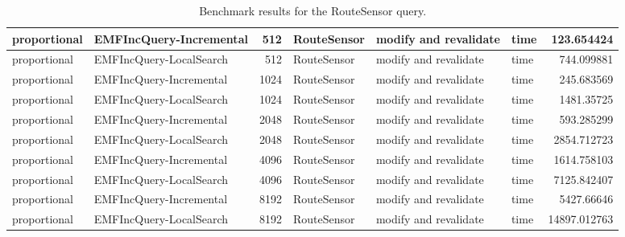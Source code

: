\begin{table}
\begin{tabular}{| l | l | r | l | l | l | r |}
proportional & EMFIncQuery-Incremental & 512 & RouteSensor & modify and revalidate & time & 123.654424\\\hline
proportional & EMFIncQuery-LocalSearch & 512 & RouteSensor & modify and revalidate & time & 744.099881\\\hline
proportional & EMFIncQuery-Incremental & 1024 & RouteSensor & modify and revalidate & time & 245.683569\\\hline
proportional & EMFIncQuery-LocalSearch & 1024 & RouteSensor & modify and revalidate & time & 1481.35725\\\hline
proportional & EMFIncQuery-Incremental & 2048 & RouteSensor & modify and revalidate & time & 593.285299\\\hline
proportional & EMFIncQuery-LocalSearch & 2048 & RouteSensor & modify and revalidate & time & 2854.712723\\\hline
proportional & EMFIncQuery-Incremental & 4096 & RouteSensor & modify and revalidate & time & 1614.758103\\\hline
proportional & EMFIncQuery-LocalSearch & 4096 & RouteSensor & modify and revalidate & time & 7125.842407\\\hline
proportional & EMFIncQuery-Incremental & 8192 & RouteSensor & modify and revalidate & time & 5427.66646\\\hline
proportional & EMFIncQuery-LocalSearch & 8192 & RouteSensor & modify and revalidate & time & 14897.012763\\\hline

\end{tabular}\caption{Benchmark results for the \textsf{RouteSensor} query.}
\label{tab:revalidation-routesensor}
\end{table}
